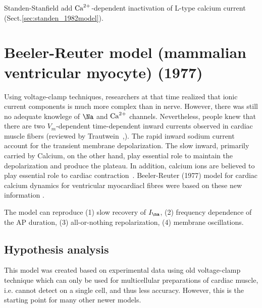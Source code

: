 Standen-Stanfield add ${\text{Ca}^{2+}}$-dependent inactivation of L-type calcium current
(Sect.\ref{sec:standen_1982model}). 



\section[Beeler-Reuter model (1977)]{Beeler-Reuter model (mammalian
  ventricular myocyte) (1977)}
\label{sec:beeler-reuter-model}

Using voltage-clamp techniques, researchers at that time realized that ionic
current components is much more complex than in nerve. However, there was still
no adequate knowlege of $\Na$ and ${\text{Ca}^{2+}}$ channels.
Nevertheless, people knew that there are two $V_m$-dependent time-dependent
inward currents observed in cardiac muscle fibers (reviewed by
Trautwein~\citep{trautwein1973mcc},). The rapid inward sodium current account
for the transient membrane depolarization. The slow inward, primarily carried by
Calcium, on the other hand, play essential role to maintain the depolarization
and produce the plateau. In addition, calcium ions are believed to play
essential role to cardiac contraction~\citep{trautwein1973sic}. Beeler-Reuter
(1977) model for cardiac calcium dynamics for ventricular myocardiacl fibres
were based on these new information \citep{beeler1977rap}.

The model can reproduce (1) slow recovery of $I_\na$, (2) frequency dependence
of the AP duration, (3) all-or-nothing repolarization, (4) membrane
oscillations.

\subsection{Hypothesis analysis}
\label{sec:hypothesis-analysis}

\begin{framed}
  This model was created based on experimental data using old
  voltage-clamp technique which can only be used for multicellular
  preparations of cardiac muscle, i.e. cannot detect on a single cell,
  and thus less accuracy. However, this is the starting point for many
  other newer models.
\end{framed}

